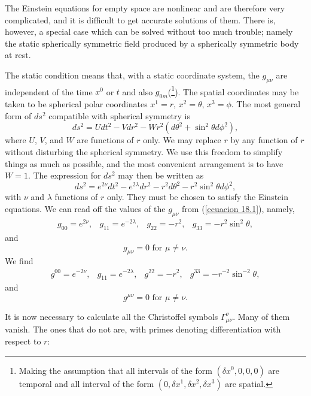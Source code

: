 The Einstein equations for empty space are nonlinear and are therefore very complicated, and it is difficult to get 
accurate solutions of them. There is, however, a special case which can be solved without too much trouble; namely the 
static spherically symmetric field produced by a spherically symmetric body at rest.

The static condition means that, with a static coordinate system, the $g_{\mu\nu}$ are independent of the time $x^0$ or 
$t$ and also $g_{0m}$(\footnote{Making the assumption that all intervals of the form $(\delta x^0,0,0,0)$ are temporal 
and all interval of the form $(0,\delta x^1, \delta x^2, \delta x^3)$ are spatial.}). The spatial coordinates may be 
taken to be spherical polar coordinates $x^1 = r,\,x^2=\theta,\,x^3=\phi$. The most general form of $ds^2$ compatible 
with spherical symmetry is
\[
 ds^2 = U dt^2 - V dr^2 -W r^2(d\theta^2 + \sin^2\theta d\phi^2),
\]
where $U$, $V$, and $W$ are functions of $r$ only. We may replace $r$ by any function of $r$ without disturbing the 
spherical symmetry. We use this freedom to simplify things as much as possible, and the most convenient arrangement is 
to have $W=1$. The expression for $ds^2$ may then be written as 
\begin{equation}
 \label{ecuacion 18.1}
 ds^2 = e^{2\nu} dt^2 - e^{2\lambda} dr^2 - r^2 d\theta^2 - r^2 \sin^2 \theta d\phi^2,
\end{equation}
with $\nu$ and $\lambda$ functions of $r$ only. They must be chosen to satisfy the Einstein equations. We can read off 
the values of the $g_{\mu\nu}$ from (\ref{ecuacion 18.1}), namely,
\[
\begin{array}{cccc}
 g_00 = e^{2\nu}, & g_{11} = e^{-2\lambda}, & g_{22} = -r^2, & g_{33} = - r^2 \sin^2\theta,
\end{array}
\]
and 
\[
g_{\mu\nu} = 0 \mbox{ for } \mu \ne \nu .
\]
We find
\[
   \begin{array}{cccc}
   g^{00} = e^{-2\nu}, & g_{11} = e^{-2\lambda}, & g^{22} = -r^2, &  g^{33} = -r^{-2} \sin^{-2} 
\theta,
   \end{array}
\]
and
\[
 g^{\mu\nu} = 0 \mbox{ for } \mu \ne \nu .
\]

It is now necessary to calculate all the Christoffel symbols $\Gamma^\sigma_{\mu\nu}$. Many of them vanish. The ones 
that do not are, with primes denoting differentiation with respect to $r$:


